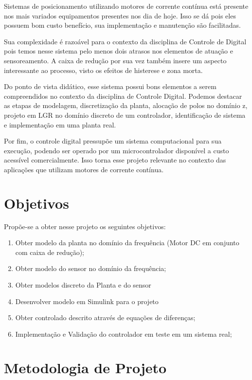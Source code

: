 \documentclass[a4paper,11pt]{article}
\begin{document}
Sistemas de posicionamento utilizando motores de corrente contínua está presente nos mais variados equipamentos presentes nos dia de hoje. Isso se dá pois eles possuem bom custo benefício, sua implementação e manutenção são facilitadas.

Sua complexidade é razoável para o contexto da disciplina de Controle de Digital pois temos nesse sistema pelo menos dois atrasos nos elementos de atuação e sensoreamento. A caixa de redução por sua vez também insere um aspecto interessante ao processo, visto os efeitos de histerese e zona morta.

Do ponto de vista didático, esse sistema possui bons elementos a serem compreendidos no contexto da disciplina de Controle Digital. Podemos destacar as etapas de modelagem, discretização da planta, alocação de polos no domínio z, projeto em LGR no domínio discreto de um controlador, identificação de sistema e implementação em uma planta real.

Por fim, o controle digital pressupõe um sistema computacional para sua execução, podendo ser operado por um microcontrolador disponível a custo acessível comercialmente. Isso torna esse projeto relevante no contexto das aplicações que utilizam motores de corrente contínua.


\section{Objetivos}

Propõe-se a obter nesse projeto os seguintes objetivos:

 \begin{enumerate}
   \item Obter modelo da planta no domínio da frequência (Motor DC em conjunto com caixa de redução);
   \item Obter modelo do sensor no domínio da frequência;
   \item Obter modelos discreto da Planta e do sensor
   \item Desenvolver modelo em Simulink para o projeto
   \item Obter controlado descrito através de equações de diferenças;
   \item Implementação e Validação do controlador em teste em um sistema real;
 \end{enumerate}

\section{Metodologia de Projeto}
\end{document}
